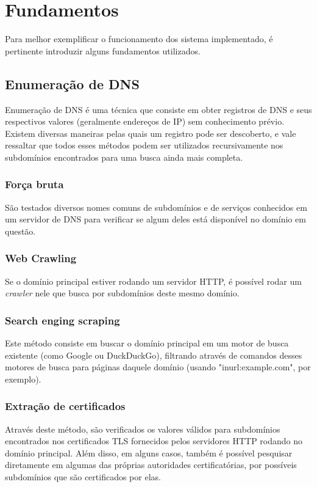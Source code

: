 \chapter{Fundamentos}
\label{cap:fundamentos}

Para melhor exemplificar o funcionamento dos sistema implementado, é pertinente introduzir alguns fundamentos utilizados. 

\section{Enumeração de DNS}

Enumeração de DNS é uma técnica que consiste em obter registros de DNS e seus respectivos valores (geralmente endereços de IP) sem conhecimento prévio. Existem diversas maneiras pelas quais um registro pode ser descoberto, e vale ressaltar que todos esses métodos podem ser utilizados recursivamente nos subdomínios encontrados para uma busca ainda mais completa.
        
        \subsection{Força bruta} São testados diversos nomes comuns  de subdomínios e de serviços conhecidos em um servidor de DNS para verificar se algum deles está disponível no domínio em questão.
        
        \subsection{Web Crawling} Se o domínio principal estiver rodando um servidor HTTP, é possível rodar um \textit{crawler} nele que busca por subdomínios deste mesmo domínio.
        
        \subsection{Search enging scraping} Este método consiste em buscar o domínio principal em um motor de busca existente (como Google ou DuckDuckGo), filtrando através de comandos desses motores de busca para páginas daquele domínio (usando "inurl:example.com", por exemplo).
        
        \subsection{Extração de certificados} Através deste método, são verificados os valores válidos para subdomínios encontrados nos certificados TLS fornecidos pelos servidores HTTP rodando no domínio principal. Além disso, em alguns casos, também é possível pesquisar diretamente em algumas das próprias autoridades certificatórias, por possíveis subdomínios que são certificados por elas.
        
